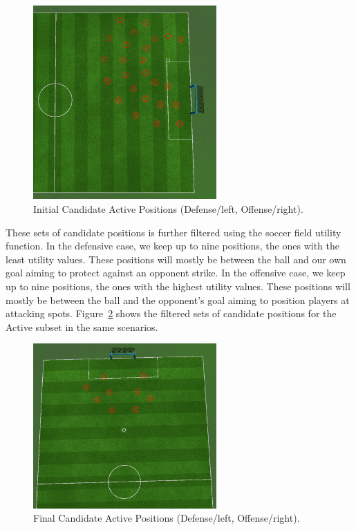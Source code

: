 \begin{figure}[t!]
\centering
  \includegraphics[width=7cm]{Chapter4/figures/ActivePositions2.png}
  \caption{Initial Candidate Active Positions (Defense/left, Offense/right).} 
  \label{fig:ActivePositions2}
\end{figure}

These sets of candidate positions is further filtered using the soccer field utility function. In the defensive case, we keep up to nine positions, the ones with the least utility values. These positions will mostly be between the ball and our own goal aiming to protect against an opponent strike. In the offensive case, we keep up to nine positions, the ones with the highest utility values. These positions will mostly be between the ball and the opponent's goal aiming to position players at attacking spots. Figure~\ref{fig:ActivePositions3} shows the filtered sets of candidate positions for the Active subset in the same scenarios.


\begin{figure}[t!]
\centering
  \includegraphics[width=7cm]{Chapter4/figures/Active3.png}
  \caption{Final Candidate Active Positions (Defense/left, Offense/right).} 
  \label{fig:ActivePositions3}
\end{figure}


